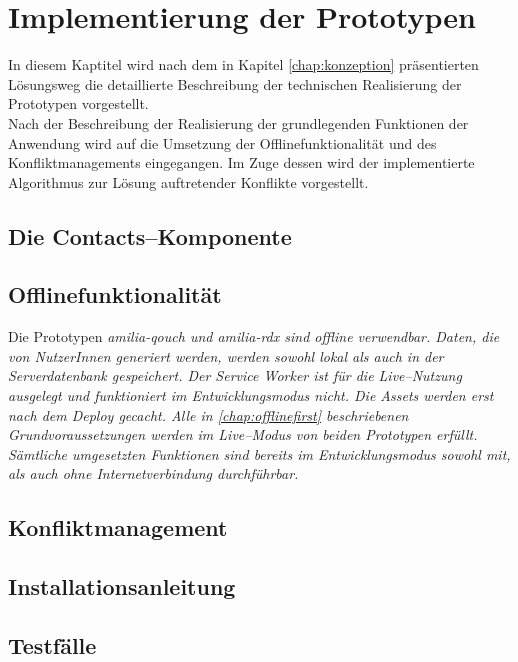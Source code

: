 \chapter{\label{chap:implementierung}Implementierung der Prototypen}
In diesem Kaptitel wird nach dem in Kapitel \ref{chap:konzeption} präsentierten Lösungsweg die detaillierte Beschreibung der technischen Realisierung der Prototypen vorgestellt.\\
Nach der Beschreibung der Realisierung der grundlegenden Funktionen der Anwendung wird auf die Umsetzung der Offlinefunktionalität und des Konfliktmanagements eingegangen.
Im Zuge dessen wird der implementierte Algorithmus zur Lösung auftretender Konflikte vorgestellt.
%
%
%
\section{Die Contacts--Komponente}

%
%
%
\section{Offlinefunktionalität}
Die Prototypen \it{amilia-qouch} und \it{amilia-rdx} sind offline verwendbar.
Daten, die von NutzerInnen generiert werden, werden sowohl lokal als auch in der Serverdatenbank gespeichert.
Der Service Worker ist für die Live--Nutzung ausgelegt und funktioniert im Entwicklungsmodus nicht. Die \gls{Assets} werden erst nach dem Deploy gecacht.
Alle in \autoref{chap:offlinefirst} beschriebenen Grundvoraussetzungen werden im Live--Modus von beiden Prototypen erfüllt.
Sämtliche umgesetzten Funktionen sind bereits im Entwicklungsmodus sowohl mit, als auch ohne Internetverbindung durchführbar.
%

%
%
%
\section{\label{chap:konfliktmanagement}Konfliktmanagement}

%
%
\section{Installationsanleitung}


%
%
\section{\label{chap:impl:test}Testfälle}
